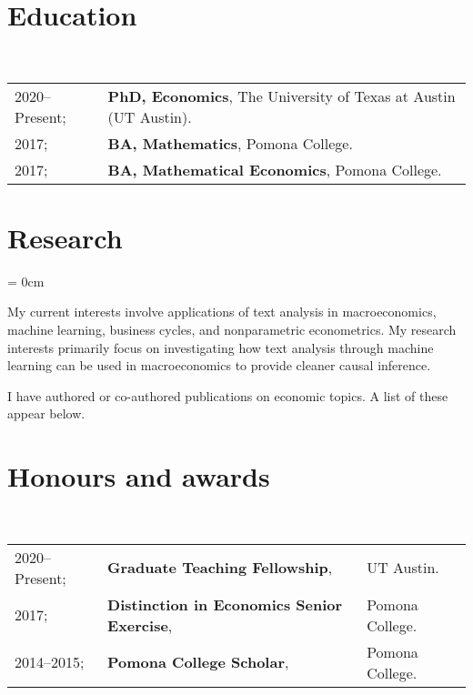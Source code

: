 \documentclass[a4paper, 10pt]{article}
\begin{document}
  \maketitle
  \thispagestyle{firststyle}
  \section{Education}
  ~\begin{tabular}{ll}
    2020--Present; & \textbf{PhD, Economics}, The University of Texas at Austin (UT Austin).\\
    2017; & \textbf{BA, Mathematics}, Pomona College.\\
    2017; & \textbf{BA, Mathematical Economics}, Pomona College.\\
  \end{tabular}
  \vspace*{0.25em}

  \section{Research}
  \begin{compactitem}\parskip = 0cm
    \item My current interests involve applications of text analysis in macroeconomics, machine learning, business cycles, and nonparametric econometrics. My research interests primarily focus on investigating how text analysis through machine learning can be used in macroeconomics to provide cleaner causal inference.
    \item I have authored or co-authored  publications on economic topics. A list of these appear below.
  \end{compactitem}
  \vspace*{0.25em}

  \vspace*{-0.75em}
  \begin{publications}
  \end{publications}
  \vspace*{-0.75em}

  \section{Honours and awards}
  ~\begin{tabular}{lll}
    2020--Present; & \textbf{Graduate Teaching Fellowship}, & UT Austin.\\
    2017; & \textbf{Distinction in Economics Senior Exercise}, & Pomona College.\\
    2014--2015; & \textbf{Pomona College Scholar}, & Pomona College.
  \end{tabular}
  \vspace*{0.25em}
\end{document}
